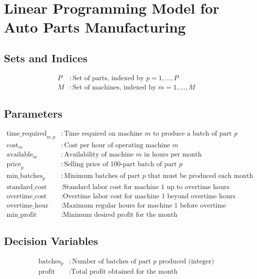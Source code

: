 \documentclass{article}
\begin{document}
\section*{Linear Programming Model for Auto Parts Manufacturing}

\subsection*{Sets and Indices}
\begin{align*}
P & : \text{Set of parts, indexed by } p = 1, \ldots, P \\
M & : \text{Set of machines, indexed by } m = 1, \ldots, M
\end{align*}

\subsection*{Parameters}
\begin{align*}
\text{time\_required}_{m,p} & : \text{Time required on machine } m \text{ to produce a batch of part } p \\
\text{cost}_{m} & : \text{Cost per hour of operating machine } m \\
\text{available}_{m} & : \text{Availability of machine } m \text{ in hours per month} \\
\text{price}_{p} & : \text{Selling price of 100-part batch of part } p \\
\text{min\_batches}_{p} & : \text{Minimum batches of part } p \text{ that must be produced each month} \\
\text{standard\_cost} & : \text{Standard labor cost for machine 1 up to overtime hours} \\
\text{overtime\_cost} & : \text{Overtime labor cost for machine 1 beyond overtime hours} \\
\text{overtime\_hour} & : \text{Maximum regular hours for machine 1 before overtime} \\
\text{min\_profit} & : \text{Minimum desired profit for the month}
\end{align*}

\subsection*{Decision Variables}
\begin{align*}
\text{batches}_{p} & : \text{Number of batches of part } p \text{ produced (integer)} \\
\text{profit} & : \text{Total profit obtained for the month}
\end{align*}
\end{document}
